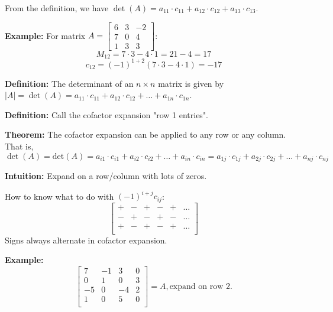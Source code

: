 \documentclass{article}
\begin{document}
From the definition, we have \( \det(A) = a_{11} \cdot c_{11} + a_{12} \cdot c_{12} + a_{13} \cdot c_{13} \).

\textbf{Example:} For matrix \( A = \begin{bmatrix} 6 & 3 & -2 \\ 7 & 0 & 4 \\ 1 & 3 & 3 \end{bmatrix} \):
\[ M_{12} = 7 \cdot 3 - 4 \cdot 1 = 21 - 4 = 17 \]
\[ c_{12} = (-1)^{1+2}(7 \cdot 3 - 4 \cdot 1) = -17 \]

\textbf{Definition:} The determinant of an \( n \times n \) matrix is given by \( |A| = \det(A) = a_{11} \cdot c_{11} + a_{12} \cdot c_{12} + \ldots + a_{1n} \cdot c_{1n} \).

\textbf{Definition:} Call the cofactor expansion "row 1 entries".

\textbf{Theorem:} The cofactor expansion can be applied to any row or any column. That is,
\[ \det(A) = \text{det}(A) = a_{i1} \cdot c_{i1} + a_{i2} \cdot c_{i2} + \ldots + a_{in} \cdot c_{in} = a_{1j} \cdot c_{1j} + a_{2j} \cdot c_{2j} + \ldots + a_{nj} \cdot c_{nj} \]

\textbf{Intuition:} Expand on a row/column with lots of zeros.

How to know what to do with $(-1)^{i+j} c_{ij}$:
\[
\begin{bmatrix}
+ & - & + & - & + & \ldots \\
- & + & - & + & - & \ldots \\
+ & - & + & - & + & \ldots \\
\end{bmatrix}
\]
Signs always alternate in cofactor expansion.

\textbf{Example:} 
\[
\begin{bmatrix}
7 & -1 & 3 & 0 \\
0 & 1 & 0 & 3 \\
-5 & 0 & -4 & 2 \\
1 & 0 & 5 & 0 \\
\end{bmatrix} = A, \text{expand on row 2.}
\]
\end{document}
